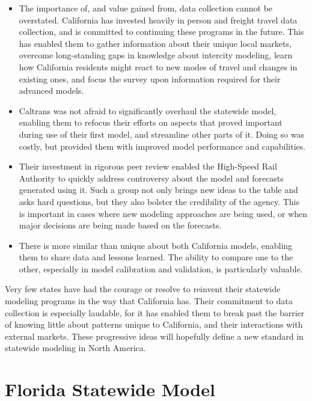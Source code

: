 \begin{itemize}
\item
The importance of, and value gained from, data collection cannot be overstated. California has invested heavily in person and freight travel data collection, and is committed to continuing these programs in the future. This has enabled them to gather information about their unique local markets, overcome long-standing gaps in knowledge about intercity modeling, learn how California residents might react to new modes of travel and changes in existing ones, and focus the survey upon information required for their advanced models.
\item
Caltrans was not afraid to significantly overhaul the statewide model, enabling them to refocus their efforts on aspects that proved important during use of their first model, and streamline other parts of it. Doing so was costly, but provided them with improved model performance and capabilities.
\item
Their investment in rigorous peer review enabled the High-Speed Rail Authority to quickly address controversy about the model and forecasts generated using it. Such a group not only brings new ideas to the table and asks hard questions, but they also bolster the credibility of the agency. This is important in cases where new modeling approaches are being used, or when major decisions are being made based on the forecasts.
\item
There is more similar than unique about both California models, enabling them to share data and lessons learned. The ability to compare one to the other, especially in model calibration and validation, is particularly valuable.
\end{itemize}

Very few states have had the courage or resolve to reinvent their statewide modeling programs in the way that California has. Their commitment to data collection is especially laudable, for it has enabled them to break past the barrier of knowing little about patterns unique to California, and their interactions with external markets. These progressive ideas will hopefully define a new standard in statewide modeling in North America.

\section{Florida Statewide Model}

